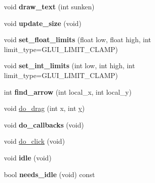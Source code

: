 \begin{DoxyCompactItemize}
\item 
\hypertarget{class_g_l_u_i___spinner_a0e5448695af2091ce345460e62c81936}{void {\bfseries draw\+\_\+text} (int sunken)}\label{class_g_l_u_i___spinner_a0e5448695af2091ce345460e62c81936}

\item 
\hypertarget{class_g_l_u_i___spinner_a4cde5eb0183892fc45de009844894e42}{void {\bfseries update\+\_\+size} (void)}\label{class_g_l_u_i___spinner_a4cde5eb0183892fc45de009844894e42}

\item 
\hypertarget{class_g_l_u_i___spinner_ac6a2c44defbf97ef70375ab8d0f9cb45}{void {\bfseries set\+\_\+float\+\_\+limits} (float low, float high, int limit\+\_\+type=G\+L\+U\+I\+\_\+\+L\+I\+M\+I\+T\+\_\+\+C\+L\+A\+M\+P)}\label{class_g_l_u_i___spinner_ac6a2c44defbf97ef70375ab8d0f9cb45}

\item 
\hypertarget{class_g_l_u_i___spinner_aa1a2609687a9ed2c6ab71944f052ed61}{void {\bfseries set\+\_\+int\+\_\+limits} (int low, int high, int limit\+\_\+type=G\+L\+U\+I\+\_\+\+L\+I\+M\+I\+T\+\_\+\+C\+L\+A\+M\+P)}\label{class_g_l_u_i___spinner_aa1a2609687a9ed2c6ab71944f052ed61}

\item 
\hypertarget{class_g_l_u_i___spinner_a760982be4e98d61b02bc907d175b6ae2}{int {\bfseries find\+\_\+arrow} (int local\+\_\+x, int local\+\_\+y)}\label{class_g_l_u_i___spinner_a760982be4e98d61b02bc907d175b6ae2}

\item 
void \hyperlink{class_g_l_u_i___spinner_aa6286e3baade0e3f32942bbcfc551b8a}{do\+\_\+drag} (int x, int \hyperlink{_ice_utils_8h_aa7ffaed69623192258fb8679569ff9ba}{y})
\item 
\hypertarget{class_g_l_u_i___spinner_af96a0ea91023049a11403386b9b561f0}{void {\bfseries do\+\_\+callbacks} (void)}\label{class_g_l_u_i___spinner_af96a0ea91023049a11403386b9b561f0}

\item 
void \hyperlink{class_g_l_u_i___spinner_aa06abe063d360ba9a92d192774a56cd1}{do\+\_\+click} (void)
\item 
\hypertarget{class_g_l_u_i___spinner_a2c01dfece4f8c14ca6e9a27b89604306}{void {\bfseries idle} (void)}\label{class_g_l_u_i___spinner_a2c01dfece4f8c14ca6e9a27b89604306}

\item 
\hypertarget{class_g_l_u_i___spinner_a1cdc9aa83a2e2616f39bb6b9d4fc1846}{bool {\bfseries needs\+\_\+idle} (void) const }\label{class_g_l_u_i___spinner_a1cdc9aa83a2e2616f39bb6b9d4fc1846}


\end{DoxyCompactItemize}
